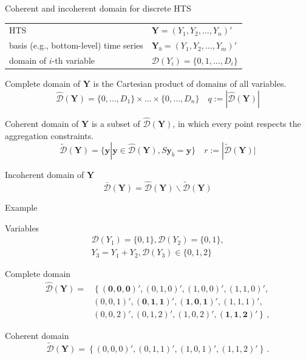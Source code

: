 \documentclass[12pt]{beamer}
\begin{document}
\begin{frame}{Coherent and incoherent domain for discrete HTS}
\begin{table}
    \fontsize{10}{12}\selectfont
\begin{tabular}{ll}
    \toprule
    HTS & $\mathbf{Y}=(Y_1,Y_2,\dots,Y_n)'$ \\
    basis (e.g., bottom-level) time series & $\mathbf{Y}_b = (Y_1,Y_2,\dots,Y_{m})'$ \\
    domain of $i$-th variable & $\mathcal{D}(Y_i) = \{0,1,\dots,D_i\}$ \\\bottomrule
\end{tabular}
\end{table}


    Complete domain of $\mathbf{Y}$ is the Cartesian product of domains of all variables.
    \[
        \hat{\mathcal{D}}(\mathbf{Y}) = \{0,\dots,D_1\}\times \dots\times \{0,\dots,D_n\} \quad q:= |\hat{\mathcal{D}}(\mathbf{Y})|
    \]

    Coherent domain of $\mathbf{Y}$ is a subset of $\hat{\mathcal{D}}(\mathbf{Y})$, in which every point respects the aggregation constraints.
    \[
        \tilde{\mathcal{D}}(\mathbf{Y}) = \{\mathbf{y} | \mathbf{y}\in \hat{\mathcal{D}}(\mathbf{Y}), S\mathbf{y}_b = \mathbf{y}\} \quad r:=|\tilde{\mathcal{D}}(\mathbf{Y})|
    \]

    Incoherent domain of $\mathbf{Y}$
    \[
        \bar{\mathcal{D}}(\mathbf{Y}) = \hat{\mathcal{D}}(\mathbf{Y}) \backslash \tilde{\mathcal{D}}(\mathbf{Y})
    \]


\end{frame}


\begin{frame}{Example}
\begin{block}{Variables}
\[
\begin{aligned}
  \mathcal{D}(Y_1) = \{0, 1\}, \mathcal{D}(Y_2) = \{0, 1\}, \\
  Y_3=Y_1+Y_2, \mathcal{D}(Y_3)\in\{0,1,2\}
\end{aligned}
\]
\end{block}


\begin{block}{Complete domain}
\[
\begin{aligned}
\hat{\mathcal D}(\mathbf{Y})=&\left\{\mathbf{(0,0,0)'},(0,1,0)',(1,0,0)',(1,1,0)',\right.\\
&\left.(0,0,1)',\mathbf{(0,1,1)'},\mathbf{(1,0,1)'},(1,1,1)',\right.\\
&\left.(0,0,2)',(0,1,2)',(1,0,2)',\mathbf{(1,1,2)'}\right\}\,,
\end{aligned}
\]
\end{block}


\begin{block}{Coherent domain}
\[
    \tilde{\mathcal D}(\mathbf{Y})=\left\{(0,0,0)',(0,1,1)',(1,0,1)',(1,1,2)'\right\}\,.
\]    
    
\end{block}
\end{frame}
\end{document}
